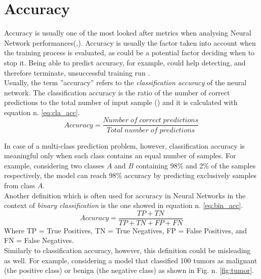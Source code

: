 \section{Accuracy}\label{sec:accuracy}
Accuracy is usually one of the most looked after metrics when analysing Neural Network performances(\cite{hendrycks2019benchmarking},\cite{bianco2018dnnsbench}). Accuracy is usually the factor taken into account when the training process is evaluated, as could be a potential factor deciding when to stop it. Being able to predict accuracy, for example, could help detecting, and therefore terminate, unsuccessful training run \cite{unterthiner2021predicting}. \\
 Usually, the term ''accuracy''  refers to the \textit{classification accuracy} of the neural network. The classification accuracy is the ratio of the number of correct predictions to the total number of input sample (\cite{hussein}) and it is calculated with equation n. \ref{eq:cla_acc}.
\begin{equation}
Accuracy = \dfrac{Number\;of\;correct\;predictions}{Total\;number\;of\;predictions}
\label{eq:cla_acc}    
\end{equation}

In case of a multi-class prediction problem, however, classification accuracy is meaningful only when each class contains an equal number of samples. For example, considering two classes $A$ and $B$ containing 98\% and 2\% of the samples respectively, the model can reach 98\% accuracy by predicting exclusively samples from class $A$. \\
Another definition which is often used for accuracy in Neural Networks in the context of \textit{binary classification} is the one showed in equation n. \ref{eq:bin_acc}.
 \begin{equation}
Accuracy = \dfrac{TP+TN}{TP+TN+FP+FN}
\label{eq:bin_acc}    
\end{equation}
Where TP = True Positives, TN = True Negatives, FP = False Positives, and FN = False Negatives.\\
Similarly to classification accuracy, however, this definition could be misleading as well.  For example, considering a model that classified 100 tumors as malignant (the positive class) or benign (the negative class) as shown in Fig. n. \ref{fig:tumor}. 

